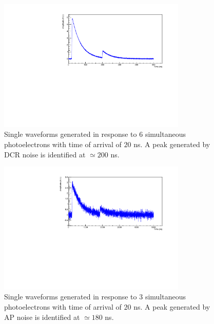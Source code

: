 \begin{figure}
	\centering
	\includegraphics[width=0.8\textwidth]{IMG/Cap5/6ph_DCR.pdf}
	\caption{Single waveforms generated in response to $6$ simultaneous photoelectrons with time of arrival of $20$ ns. A peak generated by DCR noise is identified at $\simeq 200$ ns.}
	\label{fig:wf_dcr}
\end{figure}

\begin{figure}
	\centering
	\includegraphics[width=0.8\textwidth]{IMG/Cap5/3ph_AP.pdf}
	\caption{Single waveforms generated in response to $3$ simultaneous photoelectrons with time of arrival of $20$ ns. A peak generated by AP noise is identified at $\simeq 180$ ns.}
	\label{fig:wf_ap}
\end{figure}


